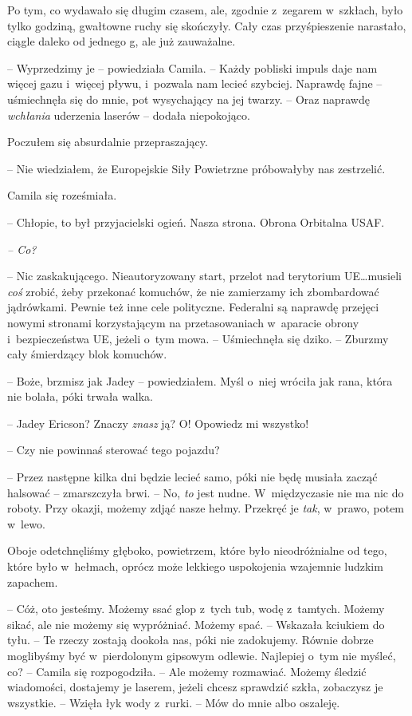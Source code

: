 \documentclass[oneside,polish,12pt,sfheadings]{mwbk}
\begin{document}
Po tym, co wydawało się długim czasem, ale, zgodnie z~zegarem w~szkłach,
było tylko godziną, gwałtowne ruchy się skończyły. Cały czas
przyśpieszenie narastało, ciągle daleko od jednego g, ale już
zauważalne.

-- Wyprzedzimy je -- powiedziała Camila. -- Każdy pobliski impuls daje nam
więcej gazu i~więcej pływu, i~pozwala nam lecieć szybciej. Naprawdę
fajne -- uśmiechnęła się do mnie, pot wysychający na jej twarzy. -- Oraz
naprawdę \emph{wchłania} uderzenia laserów -- dodała niepokojąco.

Poczułem się absurdalnie przepraszający.

-- Nie wiedziałem, że Europejskie Siły Powietrzne próbowałyby nas
zestrzelić.

Camila się roześmiała. 

-- Chłopie, to był przyjacielski ogień. Nasza
strona. Obrona Orbitalna USAF.

\emph{-- Co?}

-- Nic zaskakującego. Nieautoryzowany start, przelot nad terytorium UE\ldots musieli \emph{coś} zrobić, żeby przekonać komuchów, że nie zamierzamy
ich zbombardować jądrówkami. Pewnie też inne cele polityczne. Federalni
są naprawdę przejęci nowymi stronami korzystającym na przetasowaniach w~aparacie obrony i~bezpieczeństwa UE, jeżeli o~tym mowa. -- Uśmiechnęła
się dziko. -- Zburzmy cały śmierdzący blok komuchów.

-- Boże, brzmisz jak Jadey -- powiedziałem. Myśl o~niej wróciła jak rana,
która nie bolała, póki trwała walka.

-- Jadey Ericson? Znaczy \emph{znasz} ją? O! Opowiedz mi wszystko!

-- Czy nie powinnaś sterować tego pojazdu?

-- Przez następne kilka dni będzie lecieć samo, póki nie będę musiała
zacząć halsować -- zmarszczyła brwi. -- No, \emph{to } jest nudne. W~międzyczasie nie ma nic do roboty. Przy okazji, możemy zdjąć nasze
hełmy. Przekręć je \emph{tak}, w~prawo, potem w~lewo.

Oboje odetchnęliśmy głęboko, powietrzem, które było nieodróżnialne od
tego, które było w~hełmach, oprócz może lekkiego uspokojenia wzajemnie
ludzkim zapachem.

-- Cóż, oto jesteśmy. Możemy ssać glop z~tych tub, wodę z~tamtych. Możemy
sikać, ale nie możemy się wypróżniać. Możemy spać. -- Wskazała kciukiem
do tyłu. -- Te rzeczy zostają dookoła nas, póki nie zadokujemy. Równie
dobrze moglibyśmy być w~pierdolonym gipsowym odlewie. Najlepiej o~tym
nie myśleć, co? -- Camila się rozpogodziła. -- Ale możemy rozmawiać.
Możemy śledzić wiadomości, dostajemy je laserem, jeżeli chcesz sprawdzić
szkła, zobaczysz je wszystkie. -- Wzięła łyk wody z~rurki. -- Mów do mnie
albo oszaleję.
\end{document}
